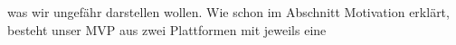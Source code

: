 was wir ungefähr darstellen wollen. Wie schon im Abschnitt Motivation erklärt, besteht unser MVP aus zwei Plattformen mit jeweils eine